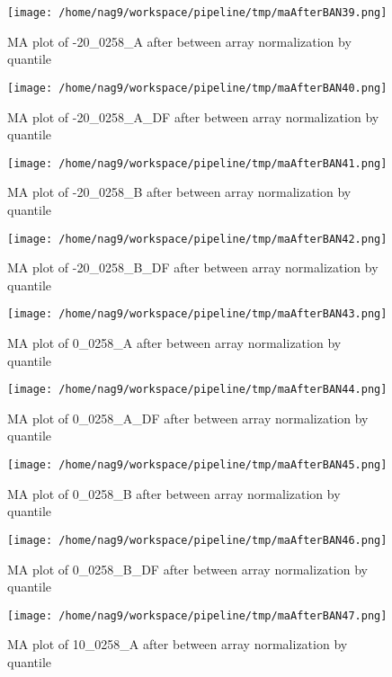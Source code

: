 \documentclass[titlepage]{article}
\begin{document}
\begin{figure}[htb!]
\centering
\texttt{[image: /home/nag9/workspace/pipeline/tmp/maAfterBAN39.png]}
\caption{MA plot of -20\_0258\_A after between array normalization by quantile}
\end{figure}\pagebreak
\begin{figure}[htb!]
\centering
\texttt{[image: /home/nag9/workspace/pipeline/tmp/maAfterBAN40.png]}
\caption{MA plot of -20\_0258\_A\_DF after between array normalization by quantile}
\end{figure}\pagebreak
\begin{figure}[htb!]
\centering
\texttt{[image: /home/nag9/workspace/pipeline/tmp/maAfterBAN41.png]}
\caption{MA plot of -20\_0258\_B after between array normalization by quantile}
\end{figure}\pagebreak
\begin{figure}[htb!]
\centering
\texttt{[image: /home/nag9/workspace/pipeline/tmp/maAfterBAN42.png]}
\caption{MA plot of -20\_0258\_B\_DF after between array normalization by quantile}
\end{figure}\pagebreak
\begin{figure}[htb!]
\centering
\texttt{[image: /home/nag9/workspace/pipeline/tmp/maAfterBAN43.png]}
\caption{MA plot of 0\_0258\_A after between array normalization by quantile}
\end{figure}\pagebreak
\begin{figure}[htb!]
\centering
\texttt{[image: /home/nag9/workspace/pipeline/tmp/maAfterBAN44.png]}
\caption{MA plot of 0\_0258\_A\_DF after between array normalization by quantile}
\end{figure}\pagebreak
\begin{figure}[htb!]
\centering
\texttt{[image: /home/nag9/workspace/pipeline/tmp/maAfterBAN45.png]}
\caption{MA plot of 0\_0258\_B after between array normalization by quantile}
\end{figure}\pagebreak
\begin{figure}[htb!]
\centering
\texttt{[image: /home/nag9/workspace/pipeline/tmp/maAfterBAN46.png]}
\caption{MA plot of 0\_0258\_B\_DF after between array normalization by quantile}
\end{figure}\pagebreak
\begin{figure}[htb!]
\centering
\texttt{[image: /home/nag9/workspace/pipeline/tmp/maAfterBAN47.png]}
\caption{MA plot of 10\_0258\_A after between array normalization by quantile}
\end{figure}\pagebreak
\end{document}
